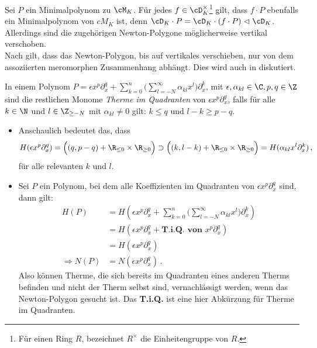\begin{bem}
Sei $P$ ein Minimalpolynom zu $\cM_K$.
Für jedes $f\in\cD_K^\times$\footnote{
Für einen Ring $R$, bezeichnet $R^\times$ die Einheitengruppe von $R$.
} gilt, dass $f\cdot P$ ebenfalls ein Minimalpolynom von $cM_K$ ist, denn 
$\cD_K\cdot P=\cD_K\cdot (f\cdot P)\vartriangleleft \cD_K$.
Allerdings sind die zugehörigen Newton-Polygone möglicherweise vertikal
verschoben.\\
Nach \cite[Seite 25]{sabbah_cimpa90} gilt, dass das Newton-Polygon, bis auf
vertikales verschieben, nur von dem assoziierten meromorphen Zusammenhang
abhängt.
Dies wird auch in \cite[Bem 5.4]{ZulaBarbara} diskutiert.
\end{bem}

\begin{defn}
In einem Polynom
$P=\epsilon x^{p}\partial_x^{q}
+\sum^{n}_{k=0}\big(\sum^{\infty}_{l=-N}{\alpha_{kl}x^l\big)\partial_x^k}$,
mit $\epsilon, \alpha_{kl}\in \C, p,q \in \Z$ sind die restlichen Monome
\emph{Therme im Quadranten} von $\epsilon x^{p}\partial_x^{q}$, falls für alle
$k\in\N$ und $l\in\Z_{\geq -N}$ mit $\alpha_{kl}\neq 0$ gilt:
$k \leq q$ und $l-k \geq p-q$.
\end{defn}
\begin{bem}
\begin{itemize}
\item Anschaulich bedeutet das, dass
\[
H(\epsilon x^{p}\partial_x^{q})
=\Big( (q,p-q) + \R_{\leq 0} \times \R_{\geq 0} \Big) \supset
\Big( (k,l-k) + \R_{\leq 0} \times \R_{\geq 0} \Big)
=H(\alpha_{kl}x^l\partial_x^k)
\,,
\]
für alle relevanten $k$ und $l$.
\item Sei $P$ ein Polynom, bei dem alle Koeffizienten im Quadranten von
$\epsilon x^{p}\partial_x^{q}$ sind, dann gilt:
\begin{align*}
H(P)&=H(\epsilon x^{p}\partial_x^{q}
  +\sum^{n}_{k=0}\big(\sum^{\infty}_{l=-N}{\alpha_{kl}x^l\big)\partial_x^k})
\\&=H(\epsilon x^{p}\partial_x^{q} + \textbf{T.i.Q. von }x^{p}\partial_x^{q})
\\&=H(\epsilon x^{p}\partial_x^{q})
\\\Rightarrow N(P)&=N(\epsilon x^{p}\partial_x^{q}) \,.
\end{align*}
Also können Therme, die sich bereits im Quadranten eines anderen Therms
befinden und nicht der Therm selbst sind, vernachlässigt werden, wenn das
Newton-Polygon gesucht ist. Das \textbf{T.i.Q.} ist eine hier Abkürzung für
Therme im Quadranten.
\end{itemize}
\end{bem}
\begin{comment}
\begin{exmp}
\[
(x^a\partial_x^b)^c
=x^{ac}\partial_x^{bc}+\textbf{T.i.Q. von }x^{ac}\partial_x^{bc}
\]
und somit gilt
\begin{align*}
N((x^a\partial_x^b)^c)
  &=N(x^{ac}\partial_x^{bc}+\textbf{T.i.Q. von }x^{ac}\partial_x^{bc})
\\&=N(x^{ac}\partial_x^{bc})
\end{align*}
\end{exmp}
\end{comment}

